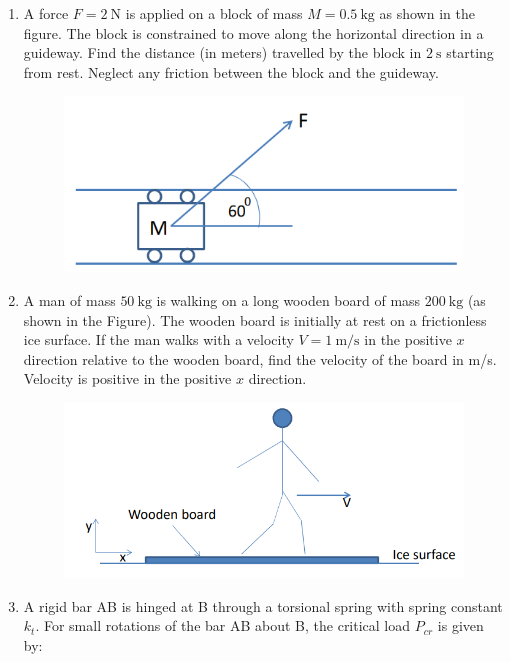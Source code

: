 \documentclass[journal,12pt,onecolumn]{IEEEtran}
\theoremstyle{remark}
\begin{document}
\begin{enumerate}
\item A force $F=2 \ \mathrm{N}$ is applied on a block of mass $M=0.5 \ \mathrm{kg}$ as shown in the figure. The block is constrained to move along the horizontal direction in a guideway. Find the distance (in meters) travelled by the block in $2 \ \mathrm{s}$ starting from rest. Neglect any friction between the block and the guideway. \underline{\hspace{2cm}}
\begin{figure}[H]
    \centering
    \includegraphics[width=0.5\columnwidth]{figs/fig13.png}
    \caption{}
    \label{fig:fig13}
\end{figure}
\item A man of mass $50 \ \mathrm{kg}$ is walking on a long wooden board of mass $200 \ \mathrm{kg}$ (as shown in the Figure). The wooden board is initially at rest on a frictionless ice surface. If the man walks with a velocity $V=1 \ \mathrm{m/s}$ in the positive $x$ direction relative to the wooden board, find the velocity of the board in m/s. Velocity is positive in the positive $x$ direction. \underline{\hspace{2cm}}
\begin{figure}[H]
    \centering
    \includegraphics[width=0.5\columnwidth]{figs/fig14.png}
    \caption{}
    \label{fig:fig14}
\end{figure}
\item A rigid bar AB is hinged at B through a torsional spring with spring constant $k_t$. For small rotations of the bar AB about B, the critical load $P_{cr}$ is given by:


\end{enumerate}
\end{document}
